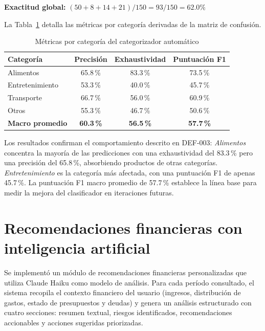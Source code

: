 \noindent\textbf{Exactitud global:} $(50+8+14+21)/150 = 93/150 = 62.0\%$

\bigskip

La Tabla~\ref{tab:metricas-clase} detalla las métricas por categoría derivadas de la matriz de confusión.

\begin{table}[H]
  \centering
  \small
  \caption{Métricas por categoría del categorizador automático}
  \label{tab:metricas-clase}
  \begin{tabular}{l c c c}
    \toprule
    \textbf{Categoría} & \textbf{Precisión} & \textbf{Exhaustividad} & \textbf{Puntuación F1} \\
    \midrule
    Alimentos       & 65.8\,\% & 83.3\,\% & 73.5\,\% \\
    Entretenimiento & 53.3\,\% & 40.0\,\% & 45.7\,\% \\
    Transporte      & 66.7\,\% & 56.0\,\% & 60.9\,\% \\
    Otros           & 55.3\,\% & 46.7\,\% & 50.6\,\% \\
    \midrule
    \textbf{Macro promedio} & \textbf{60.3\,\%} & \textbf{56.5\,\%} & \textbf{57.7\,\%} \\
    \bottomrule
  \end{tabular}
\end{table}

Los resultados confirman el comportamiento descrito en DEF-003: \textit{Alimentos} concentra la mayoría de las predicciones con una exhaustividad del 83.3\,\% pero una precisión del 65.8\,\%, absorbiendo productos de otras categorías. \textit{Entretenimiento} es la categoría más afectada, con una puntuación F1 de apenas 45.7\,\%. La puntuación F1 macro promedio de 57.7\,\% establece la línea base para medir la mejora del clasificador en iteraciones futuras.

\section{Recomendaciones financieras con inteligencia artificial}

Se implementó un módulo de recomendaciones financieras personalizadas
que utiliza Claude Haiku como modelo de análisis. Para cada período
consultado, el sistema recopila el contexto financiero del usuario
(ingresos, distribución de gastos, estado de presupuestos y deudas) y
genera un análisis estructurado con cuatro secciones: resumen textual,
riesgos identificados, recomendaciones accionables y acciones sugeridas
priorizadas.

